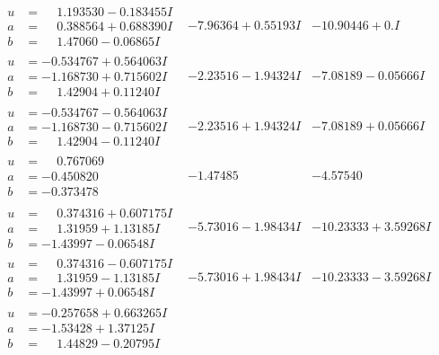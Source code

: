 \documentclass[1p]{elsarticle_modified}
\theoremstyle{definition}
\begin{document}
$$\begin{array}{c|c|c}
\begin{aligned}
u &= \phantom{-}1.193530 - 0.183455 I \\
a &= \phantom{-}0.388564 + 0.688390 I \\
b &= \phantom{-}1.47060 - 0.06865 I\end{aligned}
 & -7.96364 + 0.55193 I & -10.90446 + 0. I\phantom{ +0.000000I} \\ \hline\begin{aligned}
u &= -0.534767 + 0.564063 I \\
a &= -1.168730 + 0.715602 I \\
b &= \phantom{-}1.42904 + 0.11240 I\end{aligned}
 & -2.23516 - 1.94324 I & -7.08189 - 0.05666 I \\ \hline\begin{aligned}
u &= -0.534767 - 0.564063 I \\
a &= -1.168730 - 0.715602 I \\
b &= \phantom{-}1.42904 - 0.11240 I\end{aligned}
 & -2.23516 + 1.94324 I & -7.08189 + 0.05666 I \\ \hline\begin{aligned}
u &= \phantom{-}0.767069\phantom{ +0.000000I} \\
a &= -0.450820\phantom{ +0.000000I} \\
b &= -0.373478\phantom{ +0.000000I}\end{aligned}
 & -1.47485\phantom{ +0.000000I} & -4.57540\phantom{ +0.000000I} \\ \hline\begin{aligned}
u &= \phantom{-}0.374316 + 0.607175 I \\
a &= \phantom{-}1.31959 + 1.13185 I \\
b &= -1.43997 - 0.06548 I\end{aligned}
 & -5.73016 - 1.98434 I & -10.23333 + 3.59268 I \\ \hline\begin{aligned}
u &= \phantom{-}0.374316 - 0.607175 I \\
a &= \phantom{-}1.31959 - 1.13185 I \\
b &= -1.43997 + 0.06548 I\end{aligned}
 & -5.73016 + 1.98434 I & -10.23333 - 3.59268 I \\ \hline\begin{aligned}
u &= -0.257658 + 0.663265 I \\
a &= -1.53428 + 1.37125 I \\
b &= \phantom{-}1.44829 - 0.20795 I\end{aligned}

\end{array}$$
\end{document}
